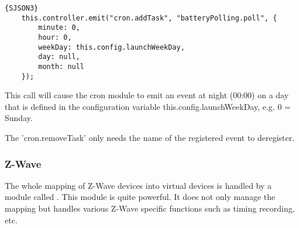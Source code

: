 \begin{lstlisting}[caption=Registering a Battery Polling Command,basicstyle=\small,columns=fullflexible]{SJSON3}
    this.controller.emit("cron.addTask", "batteryPolling.poll", {
        minute: 0,
        hour: 0,
        weekDay: this.config.launchWeekDay,
        day: null,
        month: null        
    });
\end{lstlisting}

This call will cause the cron module to emit an event at night (00:00) on a day 
that is defined in the configuration variable this.config.launchWeekDay, e.g. 0 = Sunday.

The 'cron.removeTask' only needs the name of the registered event to deregister.

\subsubsection{Z-Wave}

The whole mapping of Z-Wave devices into virtual devices is handled by a module called 
. This module is quite powerful. It does not only manage the mapping but handles
various Z-Wave specific functions such as timing recording, etc.

